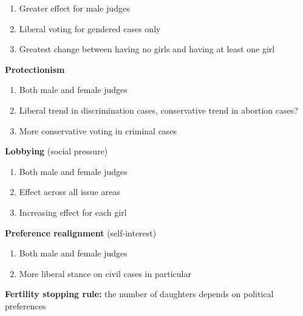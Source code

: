 \documentclass[10pt,landscape]{article}
\begin{document}
\begin{multicols*}{2}
\begin{description}
\begin{enumerate}
              \item Greater effect for male judges
              \item Liberal voting for gendered cases only
              \item Greatest change between having no girls and having at least one girl
         
           \end{enumerate} 
        
        \item \textbf{Protectionism}
          
          \begin{enumerate}
              
              \item Both male and female judges
              \item Liberal trend in discrimination cases, conservative trend in abortion cases?
              \item More conservative voting in criminal cases
         
           \end{enumerate} 
        
        \item \textbf{Lobbying} (social pressure)
          
          \begin{enumerate}
              
              \item Both male and female judges
              \item Effect across all issue areas
              \item Increasing effect for each girl
         
           \end{enumerate} 
        
        \item \textbf{Preference realignment} (self-interest)
        
          \begin{enumerate}
              
              \item Both male and female judges
              \item More liberal stance on civil cases in particular
         
           \end{enumerate} 
        
        \item \textbf{Fertility stopping rule:} the number of daughters depends on political preferences
    

\end{description}
\end{multicols*}
\end{document}
